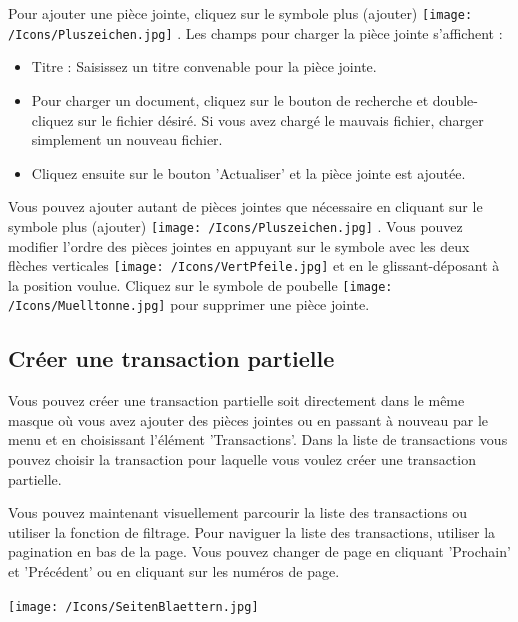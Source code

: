 \vspace{\baselineskip}

Pour ajouter une pièce jointe, cliquez sur le symbole plus (ajouter) \texttt{[image: /Icons/Pluszeichen.jpg]} . Les champs pour charger la pièce jointe s'affichent :

\begin{itemize}
\item
Titre  : Saisissez un titre convenable pour la pièce jointe.
\item
Pour charger un document, cliquez sur le bouton de recherche  et double-cliquez sur le fichier désiré. Si vous avez chargé le mauvais fichier, charger simplement un nouveau fichier.
\item
Cliquez ensuite sur le bouton 'Actualiser'  et la pièce jointe est ajoutée.
\end{itemize}


Vous pouvez ajouter autant de pièces jointes que nécessaire en cliquant sur le symbole plus (ajouter) \texttt{[image: /Icons/Pluszeichen.jpg]} . Vous pouvez modifier l'ordre des pièces jointes en appuyant sur le symbole avec les deux flèches verticales \texttt{[image: /Icons/VertPfeile.jpg]}  et en le glissant-déposant à la position voulue. Cliquez sur le symbole de poubelle \texttt{[image: /Icons/Muelltonne.jpg]}  pour supprimer une pièce jointe.


\subsection{Créer une transaction partielle}

Vous pouvez créer une transaction partielle soit directement dans le même masque où vous avez ajouter des pièces jointes ou en passant à nouveau par le menu et en choisissant l'élément 'Transactions'. Dans la liste de transactions vous pouvez choisir la transaction pour laquelle vous voulez créer une transaction partielle.

\vspace{\baselineskip}

Vous pouvez maintenant visuellement parcourir la liste des transactions ou utiliser la fonction de filtrage. Pour naviguer la liste des transactions, utiliser la pagination en bas de la page. Vous pouvez changer de page en cliquant 'Prochain' et 'Précédent' ou en cliquant sur les numéros de page.

\begin{center}
\texttt{[image: /Icons/SeitenBlaettern.jpg]}
\end{center}

